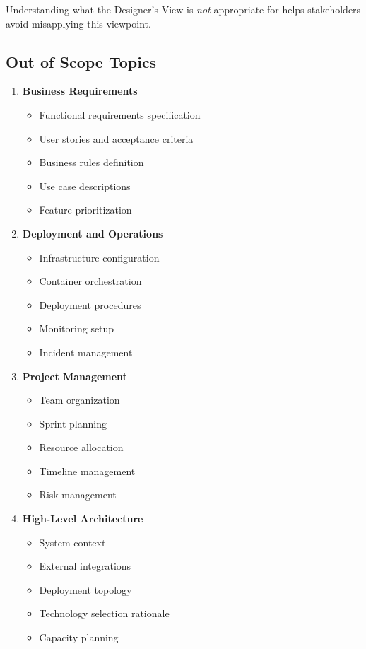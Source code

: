 \documentclass[11pt,letterpaper]{article}
\begin{document}
Understanding what the Designer's View is \emph{not} appropriate for helps stakeholders avoid misapplying this viewpoint.

\subsection{Out of Scope Topics}

\begin{enumerate}[label=\textbf{AC\arabic*:}, leftmargin=2.5em]
    \item \textbf{Business Requirements}
    \begin{itemize}[nosep]
        \item Functional requirements specification
        \item User stories and acceptance criteria
        \item Business rules definition
        \item Use case descriptions
        \item Feature prioritization
    \end{itemize}
    
    \item \textbf{Deployment and Operations}
    \begin{itemize}[nosep]
        \item Infrastructure configuration
        \item Container orchestration
        \item Deployment procedures
        \item Monitoring setup
        \item Incident management
    \end{itemize}
    
    \item \textbf{Project Management}
    \begin{itemize}[nosep]
        \item Team organization
        \item Sprint planning
        \item Resource allocation
        \item Timeline management
        \item Risk management
    \end{itemize}
    
    \item \textbf{High-Level Architecture}
    \begin{itemize}[nosep]
        \item System context
        \item External integrations
        \item Deployment topology
        \item Technology selection rationale
        \item Capacity planning
    \end{itemize}
    

\end{enumerate}
\end{document}
